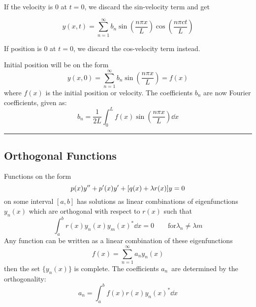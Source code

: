\documentclass[10pt,a4paper]{article}
\newcommand{\oneinfsum}{\sum_{n=1}^{\infty}}
\newcommand{\holine}{\rule{286pt}{1pt}}
\begin{document}
\begin{multicols}{2}
If the velocity is 0 at $t=0$, we discard the sin-velocity term and get

\[
    y(x,t) = \oneinfsum b_n\sin(\frac{n\pi x}{L})\cos(\frac{n\pi c t}{L})
\]

If position is 0 at $t=0$, we discard the cos-velocity term instead.

Initial position will be on the form
\[
    y(x,0) = \oneinfsum b_n \sin(\frac{n\pi x}{L}) = f(x)
\]
where $f(x)$ is the initial position or velocity. The coefficients $b_n$ are now Fourier coefficients, given as:
\[
    b_n = \frac{1}{2L}\int_{0}^{L} f(x)\sin(\frac{n\pi x}{L}) \dd{x}
\]



\holine
\subsection*{Orthogonal Functions}
Functions on the form
\[
    p(x)y'' + p'(x)y' + \qty[q(x) + \lambda r(x)]y = 0
\]
on some interval $[a,b]$ has solutions as linear combinations of eigenfunctions $y_n(x)$ which are orthogonal with respect to $r(x)$ such that
\[
    \int_a^b r(x)y_n(x)y_m(x)^* \dd{x} = 0 \quad\quad \text{for} \lambda_n \neq \lambda{m}
\]
Any function can be written as a linear combination of these eigenfunctions
\[
    f(x) = \sum_{n=1}^\infty a_n y_n(x)
\]
then the set $\{y_n(x)\}$ is complete. The coefficients $a_n$ are determined by the orthogonality:
\[
    a_n = \int_a^b f(x)r(x)y_n(x)^* \dd{x}
\]


\newpage





\end{multicols}
\end{document}
